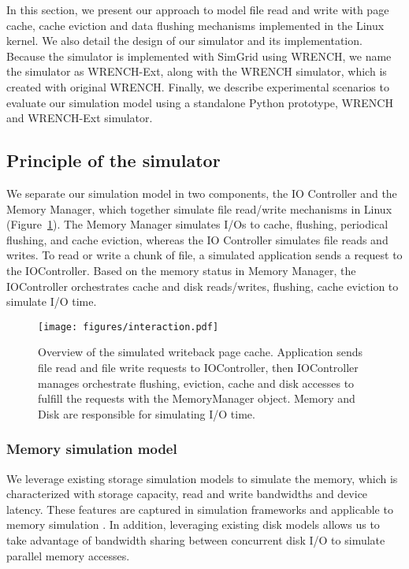 \documentclass[conference]{IEEEtran}
\begin{document}
		In this section, we present our approach to model file read and write with 
		page cache, cache eviction and data flushing mechanisms implemented 
		in the Linux kernel. 
		We also detail the design of our simulator and its implementation. 
		Because the simulator is implemented with SimGrid using WRENCH, we 
		name the simulator as WRENCH-Ext, along with the WRENCH simulator,
		which is created with original WRENCH.
		Finally, we describe experimental scenarios to evaluate our simulation model 
		using a standalone Python prototype, WRENCH and WRENCH-Ext simulator. 

		\subsection{Principle of the simulator}
	
            We separate our simulation model in two components, the IO
			Controller and the Memory Manager, which together simulate 
			file read/write mechanisms in Linux (Figure~\ref{fig:interaction}). 
			The Memory Manager simulates I/Os to cache, flushing, periodical flushing, 
			and cache eviction, whereas the IO Controller simulates file reads and writes. 			
			To read or write a chunk of file, a simulated application sends a request 
			to the IOController.
			Based on the memory status in Memory Manager, the IOController 
			orchestrates cache and disk reads/writes, flushing, cache eviction 
			to simulate I/O time.

			\begin{figure}
   				\centering
   				\texttt{[image: figures/interaction.pdf]}
				   \caption{Overview of the simulated writeback page cache.
				   Application sends file read and file write requests to IOController, 
				   then IOController manages orchestrate flushing, eviction, cache and 
				   disk accesses to fulfill the requests with the MemoryManager object. 
				   Memory and Disk are responsible for simulating I/O time.}
				   \label{fig:interaction}
			\end{figure}

			\subsubsection{Memory simulation model}
			
			We leverage existing storage simulation models to simulate the memory,
			which is characterized with storage capacity, read and write bandwidths 
			and device latency. 
			These features are captured in simulation frameworks and applicable 
			to memory simulation \cite{lebre2015}. 
			In addition, leveraging existing disk models allows us 
			to take advantage of bandwidth sharing between concurrent disk I/O to 
			simulate parallel memory accesses.
\end{document}
